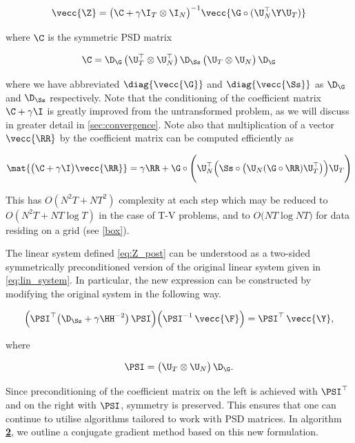 \begin{equation}
    \label{eq:Z_post}
    \vecc{\Z} = \big( \C + \gamma \I_T \otimes \I_N \big) ^{-1} \vecc{\G \circ (\U_N^\top \Y \U_T)}
\end{equation}

\noindent where $\C$ is the symmetric PSD matrix


\begin{equation}
    \label{eq:Q}
    \C = \D_{\G} \, \big(\U_T^\top \otimes \U_N^\top \big)\, \D_{\Ss} \, \big(\U_T \otimes \U_N \big) \,\D_{\G}
\end{equation}

\noindent where we have abbreviated $\diag{\vecc{\G}}$ and $\diag{\vecc{\Ss}}$ as $\D_{\G}$ and $\D_{\Ss}$ respectively. Note that the conditioning of the coefficient matrix $\C + \gamma \I$ is greatly improved from the untransformed problem, as we will discuss in greater detail in \cref{sec:convergence}. Note also that multiplication of a vector $\vecc{\RR}$ by the coefficient matrix can be computed efficiently as 

$$
\mat{\big(\C + \gamma \I \big)\vecc{\RR}} = \gamma \RR + \G \circ \Bigg(\U_N^\top \Big( \Ss \circ \big(\U_N (\G \circ \RR) \U_T^\top \big) \Big) \U_T\Bigg) 
$$

This has $O(N^2T + NT^2)$ complexity at each step which may be  reduced to $O(N^2T + NT \log T)$ in the case of T-V problems, and to $O\big(NT \log NT \big)$ for data residing on a grid (see \cref{box}). 

The linear system defined \cref{eq:Z_post} can be understood as a two-sided symmetrically preconditioned version of the original linear system given in \cref{eq:lin_system}. In particular, the new expression can be constructed by modifying the original system in the following way.

\begin{equation}
    \Big(\PSI^\top  \big(\D_{\Ss} + \gamma  \HH^{-2}\big) \, \PSI  \Big) \Big(\PSI^{-1}\, \vecc{ \F } \Big) = \PSI^\top \, \vecc{\Y},
\end{equation}

\noindent where

\begin{equation}
    \PSI =   \big(\U_T \otimes \U_N\big) \, \D_{\G}.
\end{equation}

Since preconditioning of the coefficient matrix on the left is achieved with $\PSI^\top$ and on the right with $\PSI$, symmetry is preserved. This ensures that one can continue to utilise algorithms tailored to work with PSD matrices. In algorithm \hyperlink{al:CGM}{\textbf{2}}, we outline a conjugate gradient method based on this new formulation. 

